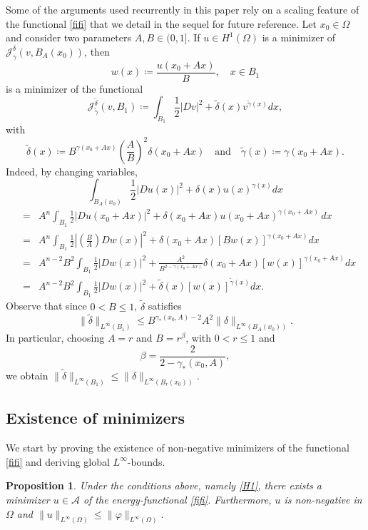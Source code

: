 \documentclass[reqno,11pt]{amsart}
\newtheorem{proposition}{Proposition}[section]
\newcommand{\1}{\mathds{1}}
\numberwithin{equation}{section}
\begin{document}
Some of the arguments used recurrently in this paper rely on a scaling feature of the functional \eqref{fifi} that we detail in the sequel for future reference. Let $x_0 \in \Omega$ and consider two parameters $A,B \in (0,1]$. If $u\in H^1(\Omega)$ is a minimizer of $\mathcal{J}_\gamma^\delta(v,B_A(x_0))$, then
\begin{equation}\label{august}
w (x) \coloneqq  \frac{u(x_0 + Ax)}{B}, \quad x\in B_1
\end{equation}
is a minimizer of the functional
$${\mathcal{J}}^{\tilde{\delta}}_{\tilde{\gamma}}(v,B_1) \coloneqq  \int_{B_1} \frac{1}{2} \left| Dv \right|^2 + \tilde{\delta}(x) v^{\tilde{\gamma}(x)} dx,$$
with
$$
\tilde{\delta}(x) \coloneqq  B^{\gamma(x_0 + Ax)}\left(\frac{A}{B} \right)^2  \delta(x_0 + Ax)  \quad \mathrm{and} \quad \tilde{\gamma}(x) \coloneqq  \gamma(x_0 + Ax).
$$   
Indeed, by changing variables,
$$\int_{B_A(x_0)} \frac{1}{2} \left| Du (x)\right|^2 + \delta(x) u(x)^{\gamma(x)} dx  $$
\begin{eqnarray*}
 &= &  A^{n} \int_{B_1} \frac{1}{2} \left| Du(x_0 + Ax) \right|^2 + \delta(x_0 + Ax)u(x_0 + Ax)^{\gamma(x_0 + Ax)}\, dx\\
 &   = &  A^n \int_{B_1} \frac{1}{2} \left| \left(\frac{B}{A} \right) Dw (x) \right|^2 + \delta(x_0 + Ax) \left[ B w (x) \right]^{\gamma(x_0 + Ax)} dx \\
 &   = & A^{n-2}B^2 \int_{B_1} \frac{1}{2} \left| Dw (x) \right|^2 + \frac{A^2}{B^{ 2-\gamma(x_0+Ax)}}  \delta(x_0 + Ax) \left[w (x) \right]^{\gamma(x_0 + Ax)} dx \\
 &   = & A^{n-2}B^2 \int_{B_1} \frac{1}{2} \left| Dw (x) \right|^2 + \tilde{\delta}(x)\left[ w (x) \right]^{\tilde{\gamma}(x)} dx.
\end{eqnarray*}
Observe that since $0<B \leq 1$, $\tilde{\delta}$ satisfies  
$$
\|\tilde{\delta}\|_{L^\infty(B_1)} \leq B^{\gamma_\ast(x_0,A) - 2} A^2\| \delta \|_{L^\infty(B_A(x_0))}. 
$$
In particular, choosing $A=r$ and $B=r^\beta$, with $0<r\leq 1$ and 
$$
\beta = \frac{2}{2-\gamma_\ast(x_0,A)},
$$
we obtain $\|\tilde \delta\|_{L^\infty(B_1)} \leq \|\delta\|_{L^\infty(B_r(x_0))}$.

\subsection{Existence of minimizers}
We start by proving the existence of non-negative minimizers of the functional \eqref{fifi} and deriving global $L^\infty$-bounds. 

\begin{proposition} Under the conditions above, namely \eqref{H1}, there exists a minimizer $u \in {\mathcal A} $ of the energy-functional \eqref{fifi}. Furthermore, $u$ is non-negative in $\Omega$ and $\|u\|_{L^\infty(\Omega)} \le \|\varphi\|_{L^\infty(\Omega)}$.
\end{proposition}
\end{document}
